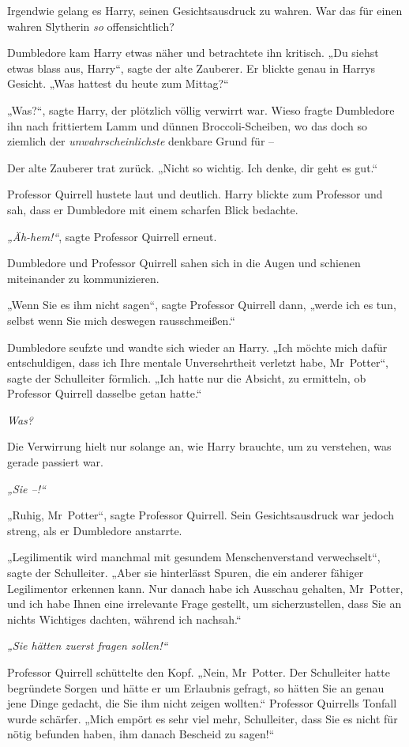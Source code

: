 {Irgendwie gelang es Harry, seinen Gesichtsausdruck zu wahren. War das für einen wahren Slytherin \emph{so} offensichtlich?

Dumbledore kam Harry etwas näher und betrachtete ihn kritisch. „Du siehst etwas blass aus, Harry“, sagte der alte Zauberer. Er blickte genau in Harrys Gesicht. „Was hattest du heute zum Mittag?“

„Was?“, sagte Harry, der plötzlich völlig verwirrt war. Wieso fragte Dumbledore ihn nach frittiertem Lamm und dünnen Broccoli-Scheiben, wo das doch so ziemlich der \emph{unwahrscheinlichste} denkbare Grund für --

Der alte Zauberer trat zurück. „Nicht so wichtig. Ich denke, dir geht es gut.“

Professor Quirrell hustete laut und deutlich. Harry blickte zum Professor und sah, dass er Dumbledore mit einem scharfen Blick bedachte.

\emph{„Äh-hem!“}, sagte Professor Quirrell erneut.

Dumbledore und Professor Quirrell sahen sich in die Augen und schienen miteinander zu kommunizieren.

„Wenn Sie es ihm nicht sagen“, sagte Professor Quirrell dann, „werde ich es tun, selbst wenn Sie mich deswegen rausschmeißen.“

Dumbledore seufzte und wandte sich wieder an Harry. „Ich möchte mich dafür entschuldigen, dass ich Ihre mentale Unversehrtheit verletzt habe, Mr~Potter“, sagte der Schulleiter förmlich. „Ich hatte nur die Absicht, zu ermitteln, ob Professor Quirrell dasselbe getan hatte.“

\emph{Was?}

Die Verwirrung hielt nur solange an, wie Harry brauchte, um zu verstehen, was gerade passiert war.

\emph{„Sie --!“}

„Ruhig, Mr~Potter“, sagte Professor Quirrell. Sein Gesichtsausdruck war jedoch streng, als er Dumbledore anstarrte.

„Legilimentik wird manchmal mit gesundem Menschenverstand verwechselt“, sagte der Schulleiter. „Aber sie hinterlässt Spuren, die ein anderer fähiger Legilimentor erkennen kann. Nur danach habe ich Ausschau gehalten, Mr~Potter, und ich habe Ihnen eine irrelevante Frage gestellt, um sicherzustellen, dass Sie an nichts Wichtiges dachten, während ich nachsah.“

\emph{„Sie hätten zuerst fragen sollen!“}

Professor Quirrell schüttelte den Kopf. „Nein, Mr~Potter. Der Schulleiter hatte begründete Sorgen und hätte er um Erlaubnis gefragt, so hätten Sie an genau jene Dinge gedacht, die Sie ihm nicht zeigen wollten.“ Professor Quirrells Tonfall wurde schärfer. „Mich empört es sehr viel mehr, Schulleiter, dass Sie es nicht für nötig befunden haben, ihm danach Bescheid zu sagen!“

}
